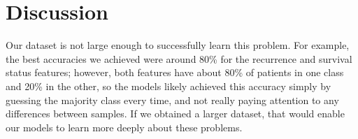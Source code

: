 \documentclass{article}
\begin{document}
\section{Discussion}

Our dataset is not large enough to successfully learn this problem. For example, the best accuracies we achieved were around 80\% for the recurrence and survival status features; however, both features have about 80\% of patients in one class and 20\% in the other, so the models likely achieved this accuracy simply by guessing the majority class every time, and not really paying attention to any differences between samples. If we obtained a larger dataset, that would enable our models to learn more deeply about these problems.



\end{document}
